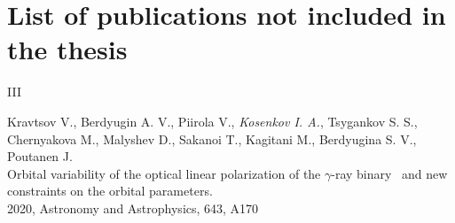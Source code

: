 \section*{List of publications not included in the thesis}
\fi
\begin{entry}{III}
    \item[] Kravtsov V., Berdyugin A. V., Piirola V., \textit{Kosenkov I. A.}, Tsygankov S. S., Chernyakova M., Malyshev D., Sakanoi T., Kagitani M., Berdyugina S. V., Poutanen J.\\ Orbital variability of the optical linear polarization of the $\gamma$-ray binary \LSI\ and new constraints on the orbital parameters.\\ 2020, Astronomy and Astrophysics, 643, A170
\end{entry}

